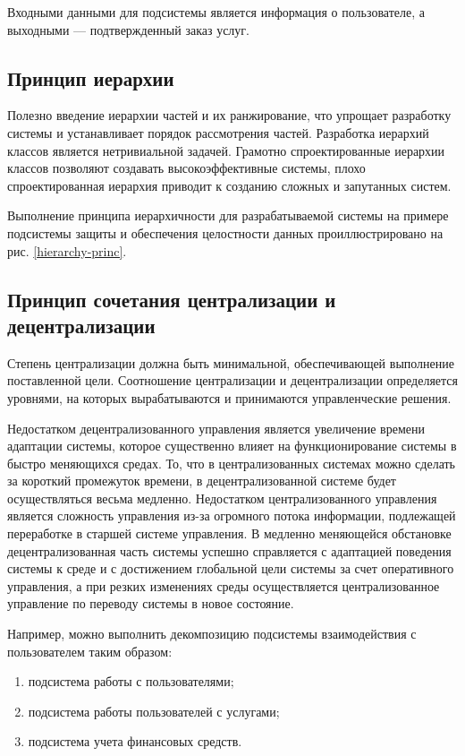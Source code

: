 Входными данными для подсистемы является информация о пользователе, а выходными --- подтвержденный заказ услуг.

\subsection{Принцип иерархии}

Полезно введение иерархии частей и их ранжирование, что упрощает разработку системы и устанавливает порядок рассмотрения частей.
Разработка иерархий классов является нетривиальной задачей.
Грамотно спроектированные иерархии классов позволяют создавать высокоэффективные системы, плохо спроектированная иерархия приводит к созданию сложных и запутанных систем.

Выполнение принципа иерархичности для разрабатываемой системы на примере подсистемы защиты и обеспечения целостности данных проиллюстрировано на рис. \ref{hierarchy-princ}.

\subsection{Принцип сочетания централизации и децентрализации}

Степень централизации должна быть минимальной, обеспечивающей выполнение поставленной цели.
Соотношение централизации и децентрализации определяется уровнями, на которых вырабатываются и принимаются управленческие решения.

Недостатком децентрализованного управления является увеличение времени адаптации системы, которое существенно влияет на функционирование системы в быстро меняющихся средах.
То, что в централизованных системах можно сделать за короткий промежуток времени, в децентрализованной системе будет осуществляться весьма медленно.
Недостатком централизованного управления является сложность управления из-за огромного потока информации, подлежащей переработке в старшей системе управления.
В медленно меняющейся обстановке децентрализованная часть системы успешно справляется с адаптацией поведения системы к среде и с достижением глобальной цели системы за счет оперативного управления, а при резких изменениях среды осуществляется централизованное управление по переводу системы в новое состояние.

Например, можно выполнить декомпозицию подсистемы взаимодействия с пользователем таким образом:
\begin{enumerate}
  \item подсистема работы с пользователями;
  \item подсистема работы пользователей с услугами;
  \item подсистема учета финансовых средств.
\end{enumerate}

